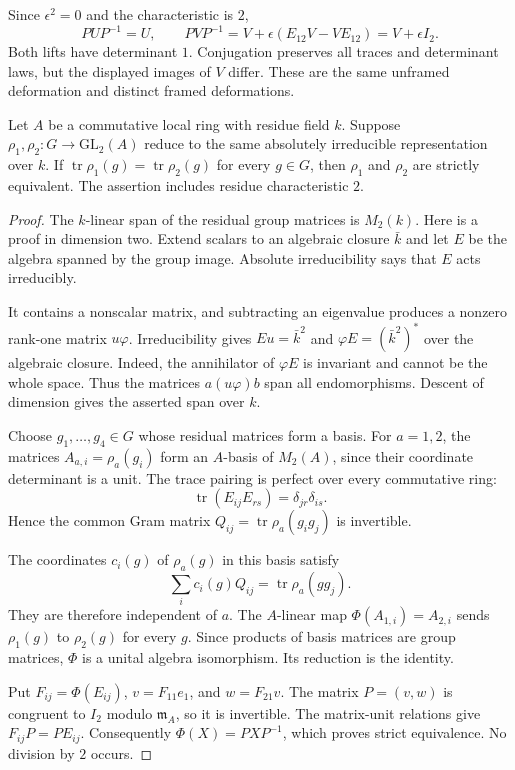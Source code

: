 Since $\epsilon^2=0$ and the characteristic is $2$,
\[
 PUP^{-1}=U,\qquad
 PVP^{-1}=V+\epsilon(E_{12}V-VE_{12})=V+\epsilon I_2.
\]
Both lifts have determinant $1$. Conjugation preserves all traces and
determinant laws, but the displayed images of $V$ differ.
These are the same unframed deformation and distinct framed deformations.

\begin{lemma}
\label{v4-arith:ic:w10-e:trace-conjugacy}
Let $A$ be a commutative local ring with residue field $k$.
Suppose $\rho_1,\rho_2:G\to\mathrm{GL}_2(A)$ reduce to the same
absolutely irreducible representation over $k$.
If $\operatorname{tr}\rho_1(g)=\operatorname{tr}\rho_2(g)$ for every
$g\in G$, then $\rho_1$ and $\rho_2$ are strictly equivalent.
The assertion includes residue characteristic $2$.
\end{lemma}

\begin{proof}
The $k$-linear span of the residual group matrices is $M_2(k)$.
Here is a proof in dimension two. Extend scalars to an algebraic
closure $\bar k$ and let $E$ be the algebra spanned by the group image.
Absolute irreducibility says that $E$ acts irreducibly.

It contains a
nonscalar matrix, and subtracting an eigenvalue produces a nonzero
rank-one matrix $u\varphi$. Irreducibility gives $Eu=\bar k^2$ and
$\varphi E=(\bar k^2)^*$ over the algebraic closure. Indeed, the annihilator
of $\varphi E$ is invariant and cannot be the whole space.
Thus the matrices $a(u\varphi)b$ span all endomorphisms.
Descent of dimension gives the asserted span over $k$.

Choose $g_1,\ldots,g_4\in G$ whose residual matrices form a basis.
For $a=1,2$, the matrices $A_{a,i}=\rho_a(g_i)$ form an $A$-basis of
$M_2(A)$, since their coordinate determinant is a unit.
The trace pairing is perfect over every commutative ring:
\[
 \operatorname{tr}(E_{ij}E_{rs})=\delta_{jr}\delta_{is}.
\]
Hence the common Gram matrix
$Q_{ij}=\operatorname{tr}\rho_a(g_i g_j)$ is invertible.

The coordinates $c_i(g)$ of $\rho_a(g)$ in this basis satisfy
\[
 \sum_i c_i(g)Q_{ij}=\operatorname{tr}\rho_a(gg_j).
\]
They are therefore independent of $a$.
The $A$-linear map $\Phi(A_{1,i})=A_{2,i}$ sends
$\rho_1(g)$ to $\rho_2(g)$ for every $g$.
Since products of basis matrices are group matrices, $\Phi$ is a
unital algebra isomorphism. Its reduction is the identity.

Put $F_{ij}=\Phi(E_{ij})$, $v=F_{11}e_1$, and $w=F_{21}v$.
The matrix $P=(v,w)$ is congruent to $I_2$ modulo $\mathfrak m_A$,
so it is invertible. The matrix-unit relations give
$F_{ij}P=PE_{ij}$. Consequently $\Phi(X)=PXP^{-1}$, which proves
strict equivalence. No division by $2$ occurs.
\end{proof}


